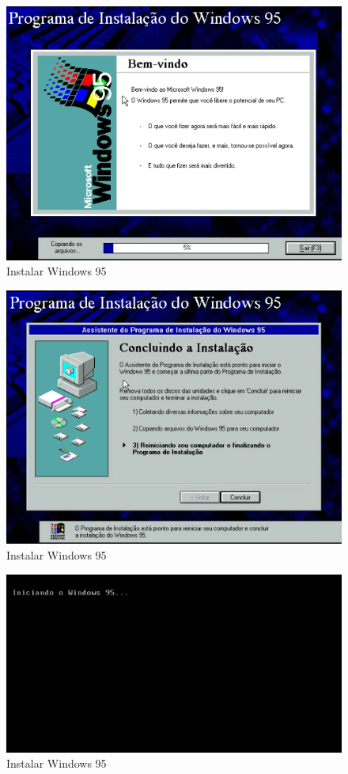 \documentclass{report}
\begin{document}
\begin{figure}
\centering
\includegraphics[width=\textwidth]{Screenshot_41.png}
\caption{Instalar Windows 95}
\label{fig:41}
\end{figure}

\begin{figure}
\centering
\includegraphics[width=\textwidth]{Screenshot_42.png}
\caption{Instalar Windows 95}
\label{fig:42}
\end{figure}

\begin{figure}
\centering
\includegraphics[width=\textwidth]{Screenshot_43.png}
\caption{Instalar Windows 95}
\label{fig:43}
\end{figure}
\end{document}
